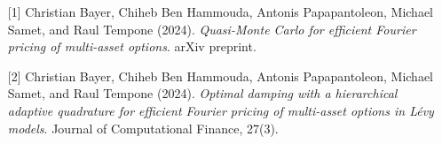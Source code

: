 \begin{talk}
\begin{enumerate}
	\item[{[1]}] Christian Bayer, Chiheb Ben Hammouda, Antonis Papapantoleon, Michael Samet, and Raul
Tempone (2024). {\it Quasi-Monte Carlo for efficient Fourier pricing of multi-asset options}. arXiv preprint.
	\item[{[2]}] Christian Bayer, Chiheb Ben Hammouda, Antonis Papapantoleon, Michael Samet, and Raul
Tempone (2024). {\it Optimal damping with a hierarchical adaptive quadrature for efficient Fourier
pricing of multi-asset options in Lévy models}. Journal of Computational Finance, 27(3).

\end{enumerate}

\end{talk}


